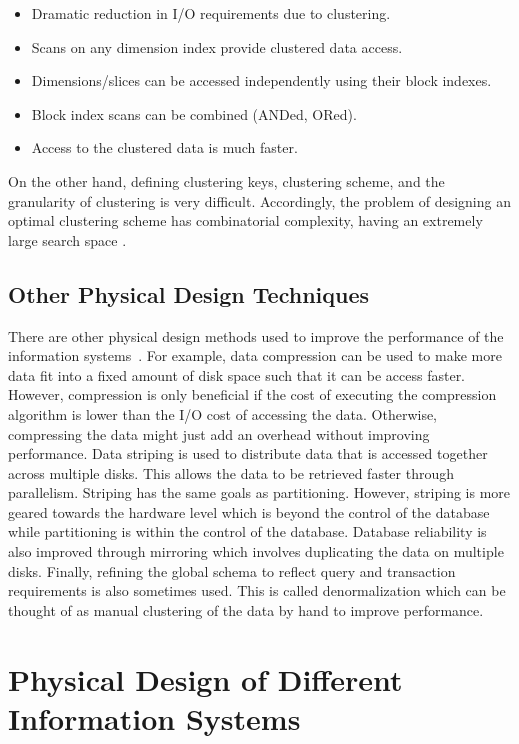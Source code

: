 \documentclass[12pt,a4paper]{article}
\begin{document}
\begin{itemize}
 \item Dramatic reduction in I/O requirements due to clustering.
 \item Scans on any dimension index provide clustered data access.
 \item Dimensions/slices can be accessed independently using their block indexes.
 \item Block index scans can be combined (ANDed, ORed).
 \item Access to the clustered data is much faster.
\end{itemize}

On the other hand, defining clustering keys, clustering scheme, and the granularity of clustering is very difficult. Accordingly, the problem of
designing an optimal clustering scheme has combinatorial complexity, having an extremely large search space \cite{jagadish1999snakes}.

\subsection{Other Physical Design Techniques}

There are other physical design methods used to improve the performance of the information systems~\cite{lightstone2007physical}. For example, data compression
can
be used to make more data fit into a fixed amount of disk space such that it can be access faster. However, compression is only beneficial if the cost of
executing the compression algorithm is lower than the I/O cost of accessing the data. Otherwise, compressing the data might just add an overhead without
improving performance. Data striping is used to distribute data that is accessed together across multiple disks. This allows the data
to be retrieved faster through parallelism. Striping has the same goals as partitioning. However, striping is more geared towards the hardware level
which is beyond the control of the database while partitioning is within the control of the database. Database reliability is also improved through mirroring
which involves duplicating the data on multiple disks. Finally, refining the global schema to reflect query and transaction requirements is also sometimes used.
This is called denormalization which can be thought of as manual clustering of the data by hand to improve performance.

\section{Physical Design of Different Information Systems}
\label{SEC-DIFFSYS}
\end{document}
